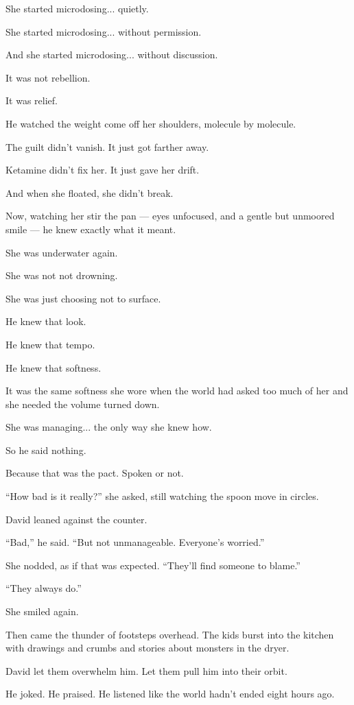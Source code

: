 She started microdosing... quietly. 

She started microdosing... without permission.

And she started microdosing... without discussion. 

It was not rebellion.

It was relief.

He watched the weight come off her shoulders, molecule by molecule.

The guilt didn’t vanish. It just got farther away.

Ketamine didn’t fix her. It just gave her drift.

And when she floated, she didn’t break.

Now, watching her stir the pan --- eyes unfocused, and a gentle but unmoored smile --- he knew exactly 
what it meant.

She was underwater again.

She was not not drowning.

She was just choosing not to surface.

He knew that look. 

He knew that tempo. 

He knew that softness.

It was the same softness she wore when the world had asked too much of her and she needed the volume 
turned down.

She was managing... the only way she knew how.

So he said nothing.

Because that was the pact.
Spoken or not.


``How bad is it really?'' she asked, still watching the spoon move in circles.

David leaned against the counter.

``Bad,'' he said. ``But not unmanageable. Everyone’s worried.''

She nodded, as if that was expected. ``They’ll find someone to blame.''

``They always do.''

She smiled again.

Then came the thunder of footsteps overhead. The kids burst into the kitchen with drawings and crumbs 
and stories about monsters in the dryer.

David let them overwhelm him. Let them pull him into their orbit.

He joked. He praised. He listened like the world hadn’t ended eight hours ago.

